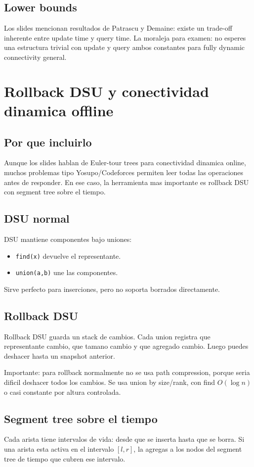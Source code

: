 \documentclass[10pt]{article}
\newcommand{\bigO}{O}
\begin{document}
\subsection{Lower bounds}
Los slides mencionan resultados de Patrascu y Demaine: existe un trade-off
inherente entre update time y query time. La moraleja para examen: no esperes
una estructura trivial con update y query ambos constantes para fully dynamic
connectivity general.

\newpage
\section{Rollback DSU y conectividad dinamica offline}

\subsection{Por que incluirlo}
Aunque los slides hablan de Euler-tour trees para conectividad dinamica online,
muchos problemas tipo Yosupo/Codeforces permiten leer todas las operaciones
antes de responder. En ese caso, la herramienta mas importante es rollback DSU
con segment tree sobre el tiempo.

\subsection{DSU normal}
DSU mantiene componentes bajo uniones:
\begin{itemize}[leftmargin=*]
\item \texttt{find(x)} devuelve el representante.
\item \texttt{union(a,b)} une las componentes.
\end{itemize}
Sirve perfecto para inserciones, pero no soporta borrados directamente.

\subsection{Rollback DSU}
Rollback DSU guarda un stack de cambios. Cada union registra que representante
cambio, que tamano cambio y que agregado cambio. Luego puedes deshacer hasta un
snapshot anterior.

Importante: para rollback normalmente no se usa path compression, porque seria
dificil deshacer todos los cambios. Se usa union by size/rank, con find
$\bigO(\log n)$ o casi constante por altura controlada.

\subsection{Segment tree sobre el tiempo}
Cada arista tiene intervalos de vida: desde que se inserta hasta que se borra.
Si una arista esta activa en el intervalo $[l,r]$, la agregas a los nodos del
segment tree de tiempo que cubren ese intervalo.
\end{document}
